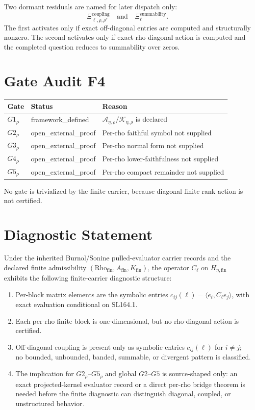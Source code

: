 \documentclass[11pt]{article}
\newcommand{\cA}{\mathcal A}
\newcommand{\cK}{\mathcal K}
\newcommand{\Rfin}{\mathrm{Rho}_{\mathrm{fin}}}
\newcommand{\Afin}{A_{\mathrm{fin}}}
\newcommand{\Kfin}{K_{\mathrm{fin}}}
\newcommand{\Cell}{C_{\ell}}
\begin{document}
Two dormant residuals are named for later dispatch only:
\[
  \Xi^{\mathrm{coupling}}_{\ell,\rho,\rho'}
  \quad\text{and}\quad
  \Xi^{\mathrm{summability}}_{\ell}.
\]
The first activates only if exact off-diagonal entries are computed and
structurally nonzero. The second activates only if exact rho-diagonal action is
computed and the completed question reduces to summability over zeros.

\section*{Gate Audit F4}

\begin{center}
\begin{tabular}{@{}lll@{}}
\toprule
Gate & Status & Reason\\
\midrule
\(G1_\rho\) & framework\_defined &
\(\cA_{\eta,\rho}/\cK_{\eta,\rho}\) is declared\\
\(G2_\rho\) & open\_external\_proof &
Per-rho faithful symbol not supplied\\
\(G3_\rho\) & open\_external\_proof &
Per-rho normal form not supplied\\
\(G4_\rho\) & open\_external\_proof &
Per-rho lower-faithfulness not supplied\\
\(G5_\rho\) & open\_external\_proof &
Per-rho compact remainder not supplied\\
\bottomrule
\end{tabular}
\end{center}

No gate is trivialized by the finite carrier, because diagonal finite-rank
action is not certified.

\section*{Diagnostic Statement}

Under the inherited Burnol/Sonine pulled-evaluator carrier records and the
declared finite admissibility \((\Rfin,\Afin,\Kfin)\), the operator \(\Cell\)
on \(H_{\eta,\mathrm{fin}}\) exhibits the following finite-carrier diagnostic
structure:
\begin{enumerate}[label=(\alph*)]
\item Per-block matrix elements are the symbolic entries
  \(c_{ij}(\ell)=\langle e_i,\Cell e_j\rangle\), with exact evaluation
  conditional on SL164.1.
\item Each per-rho finite block is one-dimensional, but no rho-diagonal action
  is certified.
\item Off-diagonal coupling is present only as symbolic entries
  \(c_{ij}(\ell)\) for \(i\neq j\); no bounded, unbounded, banded, summable, or
  divergent pattern is classified.
\item The implication for \(G2_\rho\)--\(G5_\rho\) and global \(G2\)--\(G5\)
  is source-shaped only: an exact projected-kernel evaluator record or a
  direct per-rho bridge theorem is needed before the finite diagnostic can
  distinguish diagonal, coupled, or unstructured behavior.
\end{enumerate}
\end{document}
